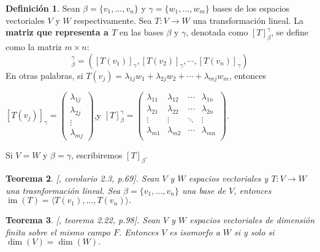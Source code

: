 \documentclass[12pt]{book}
\newtheorem{theorem}{Teorema}[section]
\theoremstyle{definition}
\newtheorem{definition}[theorem]{Definición}
\DeclareMathOperator{\im}{im}
\newcounter{in}
\newcounter{ini}
\begin{document}
\begin{definition}
  \label{matr-rep-T}
  Sean $\beta=\{v_{1},\ldots,v_{n}\}$ y
  $\gamma=\{w_{1},\ldots,w_{m}\}$ bases de los espacios
  vectoriales $V$ y $W$ respectivamente. Sea $T:V\rightarrow W$ una
  transformación lineal. La \textbf{matriz que representa a $T$}
  en las bases $\beta$ y $\gamma$, denotada como
  $[T]^{\gamma}_{\beta}$, se define como la matriz $m\times n$:
  \begin{equation*}
    [T]^{\gamma}_{\beta}=([T(v_{1})]_{\gamma},[T(v_{2})]_{\gamma},\cdots,[T(v_{n})]_{\gamma})
  \end{equation*}
  En otras palabras, si
  $T(v_{j})=\lambda_{1j}w_{1}+\lambda_{2j}w_{2}+\cdots+\lambda_{mj}w_{m}$,
  entonces
\begin{center}
    $[T(v_{j})]_{\gamma}=\begin{pmatrix}
      \lambda_{1j}\\
      \lambda_{2j}\\
      \vdots\\
      \lambda_{mj}
    \end{pmatrix}$,\quad y \quad $[T]^{\gamma}_{\beta}=\begin{pmatrix}
      \lambda_{11} & \lambda_{12} & \cdots & \lambda_{1n} \\
      \lambda_{21} & \lambda_{22} & \cdots & \lambda_{2n} \\
      \vdots & \vdots & \ddots & \vdots \\ 
      \lambda_{m1} & \lambda_{m2} & \cdots & \lambda_{mn} \\
    \end{pmatrix}$.
  \end{center}
Si $V=W$ y $\beta=\gamma$, escribiremos $[T]_{\beta}$.
\end{definition}

\begin{theorem}{[\cite{friedberg1982algebra}, corolario 2.3, p.69]}.
  \label{imT}
  Sean $V$ y $W$ espacios vectoriales y $T:V \rightarrow W$
  una trasnformación lineal. Sea $\beta=\{v_{1},\ldots,v_{n}\}$ una base de $V$,
  entonces $\im(T)=\langle T(v_{1}),\ldots,T(v_{n})\rangle.$  
\end{theorem}

\begin{theorem}{[\cite{friedberg1982algebra}, teorema 2.22, p.98]}.
  \label{esp-isomorfos}
  Sean $V$ y $W$ espacios vectoriales de dimensión finita sobre el
  mismo campo $F$. Entonces $V$ es isomorfo a $W$
  si y solo si $\dim (V)=\dim(W).$
\end{theorem}
\end{document}
